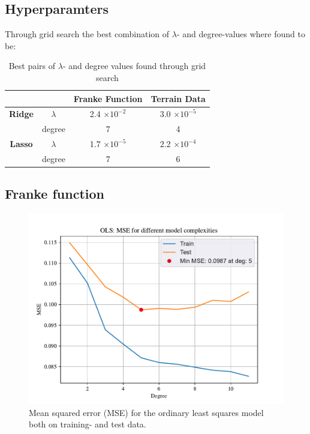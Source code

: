 \subsection{Hyperparamters}

Through grid search the best combination of $\lambda$- and degree-values where found to be: 

\begin{table}[h!]
    \centering
    \begin{tabular}{|c|c|c|c|}
        \hline
        & & \textbf{Franke Function} & \textbf{Terrain Data} \\ \hline
        \textbf{Ridge} & $\lambda$ & 2.4 $\times 10^{-2}$ & 3.0 $\times 10^{-5}$ \\ 
         & degree & 7 & 4 \\ \hline
        \textbf{Lasso} & $\lambda$ & 1.7 $\times 10^{-5}$ & 2.2 $\times 10^{-4}$ \\ 
         & degree & 7 & 6 \\ \hline
    \end{tabular}
    \caption{Best pairs of $\lambda$- and degree values found through grid search}
    \label{tab:grid}
\end{table}

\subsection{Franke function}

\begin{figure}[h!]
    \centering
    \includegraphics[width=1\linewidth]{project_1_alt/figures/figures_in_report/OLS_MSE_Franke_Noise.pdf}
    \caption{Mean squared error (MSE) for the ordinary least squares model both on training- and test data.}
    \label{fig:mseols}
\end{figure}

